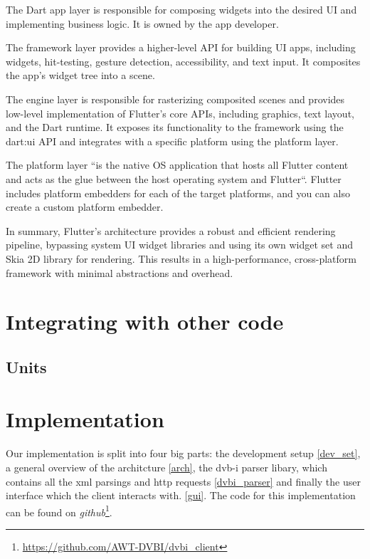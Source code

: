 \documentclass[conference]{IEEEtran}
\begin{document}
The Dart app layer is responsible for composing widgets into the desired UI and implementing business logic. It is owned by the app developer.

The framework layer provides a higher-level API for building UI apps, including widgets, hit-testing, gesture detection, accessibility, and text input. It composites the app's widget tree into a scene.

The engine layer is responsible for rasterizing composited scenes and provides low-level implementation of Flutter's core APIs, including graphics, text layout, and the Dart runtime. It exposes its functionality to the framework using the dart:ui API and integrates with a specific platform using the platform layer.

The platform layer ``is the native OS application that hosts all Flutter content and acts as the glue between the host operating system and Flutter``\cite{b1.1}. Flutter includes platform embedders for each of the target platforms, and you can also create a custom platform embedder.

In summary, Flutter's architecture provides a robust and efficient rendering pipeline, bypassing system UI widget libraries and using its own widget set and Skia 2D library for rendering. This results in a high-performance, cross-platform framework with minimal abstractions and overhead.

\section{Integrating with other code}



\subsection{Units}




\section{Implementation}



Our implementation is split into four big parts: the development setup \ref{dev_set}, a general overview of the architcture  \ref{arch}, the dvb-i parser libary, which contains all the xml parsings and http requests \ref{dvbi_parser} and finally the user interface which the client interacts with. \ref{gui}. The code for this implementation can be found on \emph{github}\footnote{\url{https://github.com/AWT-DVBI/dvbi_client}}.
\end{document}
